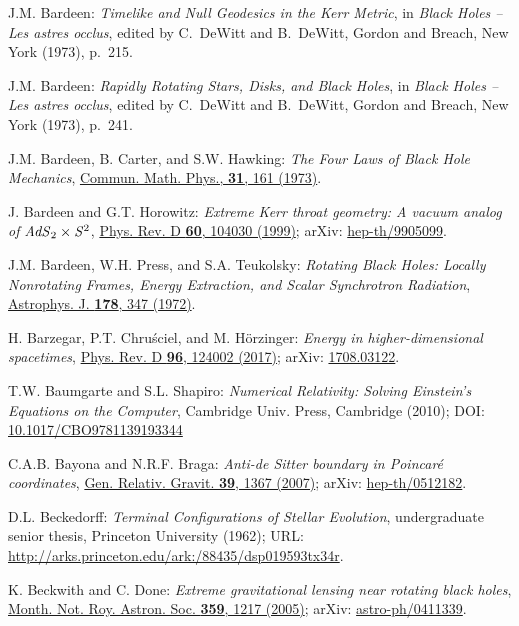 \begin{thebibliography}{123}
J.M. Bardeen:
{\em Timelike and Null Geodesics in the Kerr Metric},
in {\em Black Holes -- Les astres occlus},  edited by C.~DeWitt and B.~DeWitt,
Gordon and Breach, New York (1973), p.~215.

J.M. Bardeen:
{\em Rapidly Rotating Stars, Disks, and Black Holes},
in {\em Black Holes -- Les astres occlus},  edited by C.~DeWitt and B.~DeWitt,
Gordon and Breach, New York (1973), p.~241.

J.M. Bardeen, B. Carter, and S.W. Hawking:
{\em The Four Laws of Black Hole Mechanics},
\href{https://doi.org/10.1007/BF01645742}{Commun. Math. Phys., {\bf 31}, 161 (1973)}.

J. Bardeen and G.T. Horowitz:
{\em Extreme Kerr throat geometry: A vacuum analog of ${\it AdS}_2\times{\it S}^2$},
\href{https://doi.org/10.1103/PhysRevD.60.104030}{Phys. Rev. D {\bf 60}, 104030 (1999)};
arXiv: \href{https://arxiv.org/abs/hep-th/9905099}{hep-th/9905099}.

J.M. Bardeen, W.H. Press, and S.A. Teukolsky:
{\em Rotating Black Holes: Locally Nonrotating Frames, Energy Extraction, and Scalar Synchrotron Radiation},
\href{https://doi.org/10.1086/151796}{Astrophys. J. {\bf  178}, 347 (1972)}.

H. Barzegar, P.T. Chruściel, and M. Hörzinger:
{\em Energy in higher-dimensional spacetimes},
\href{https://doi.org/10.1103/PhysRevD.96.124002}{Phys. Rev. D {\bf 96}, 124002 (2017)};
arXiv: \href{https://arxiv.org/abs/1708.03122}{1708.03122}.

T.W. Baumgarte and S.L. Shapiro:
{\em Numerical Relativity: Solving Einstein's Equations on the Computer},
Cambridge Univ. Press, Cambridge (2010);
DOI: \href{https://doi.org/10.1017/CBO9781139193344}{10.1017/CBO9781139193344}

C.A.B. Bayona and N.R.F. Braga:
{\em Anti-de Sitter boundary in Poincaré coordinates},
\href{https://doi.org/10.1007/s10714-007-0446-y}{Gen. Relativ. Gravit. {\bf 39}, 1367 (2007)};
arXiv: \href{https://arxiv.org/abs/hep-th/0512182}{hep-th/0512182}.

D.L. Beckedorff:
{\em Terminal Configurations of Stellar Evolution},
undergraduate senior thesis, Princeton University (1962);
URL: \url{http://arks.princeton.edu/ark:/88435/dsp019593tx34r}.

K. Beckwith and C. Done:
{\em Extreme gravitational lensing near rotating black holes},
\href{https://doi.org/10.1111/j.1365-2966.2005.08980.x}{Month. Not. Roy. Astron. Soc. {\bf 359}, 1217 (2005)};
arXiv: \href{https://arxiv.org/abs/astro-ph/0411339}{astro-ph/0411339}.


\end{thebibliography}
